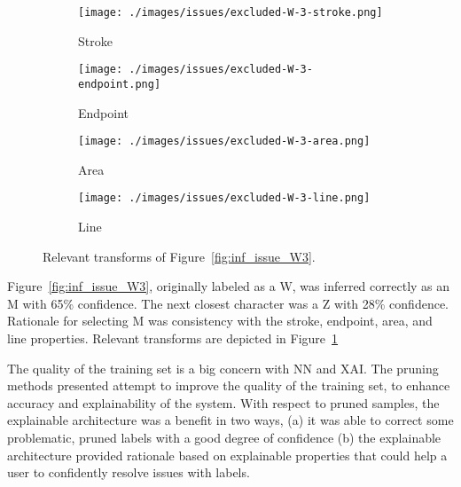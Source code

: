 \begin{figure}[H]
    \centering
    \begin{subfigure}{.20\textwidth}
        \centering
        \texttt{[image: ./images/issues/excluded-W-3-stroke.png]}
        \caption{Stroke}
    \end{subfigure}%
    \begin{subfigure}{.20\textwidth}
        \centering
        \texttt{[image: ./images/issues/excluded-W-3-endpoint.png]}
        \caption{Endpoint}
    \end{subfigure}%
    \begin{subfigure}{.20\textwidth}
        \centering
        \texttt{[image: ./images/issues/excluded-W-3-area.png]}
        \caption{Area}
    \end{subfigure}%
    \begin{subfigure}{.20\textwidth}
        \centering
        \texttt{[image: ./images/issues/excluded-W-3-line.png]}
        \caption{Line}
    \end{subfigure}%
    \caption{Relevant transforms of Figure~\ref{fig:inf_issue_W3}.}
    \label{fig:w3_trans}
\end{figure}

Figure~\ref{fig:inf_issue_W3}, originally labeled as a W, was inferred correctly
as an M with 65\% confidence. The next closest character was a Z with 28\%
confidence.  Rationale for selecting M was consistency with the stroke,
endpoint, area, and line properties.  Relevant transforms are depicted in
Figure~\ref{fig:w3_trans}


The quality of the training set is a big concern with NN and XAI.  The pruning
methods presented attempt to improve the quality of the training set, to enhance
accuracy and explainability of the system. With respect to pruned samples, the
explainable architecture was a benefit in two ways, (a) it was able to correct
some problematic, pruned labels with a good degree of confidence (b) the
explainable architecture provided rationale based on explainable properties that
could help a user to confidently resolve issues with labels.

